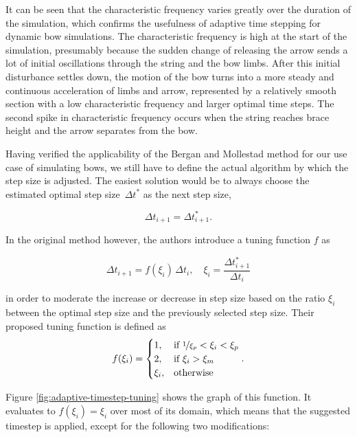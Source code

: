 It can be seen that the characteristic frequency varies greatly over the duration of the simulation, which confirms the usefulness of adaptive time stepping for dynamic bow simulations.
The characteristic frequency is high at the start of the simulation, presumably because the sudden change of releasing the arrow sends a lot of initial oscillations through the string and the bow limbs.
After this initial disturbance settles down, the motion of the bow turns into a more steady and continuous acceleration of limbs and arrow, represented by a relatively smooth section with a low characteristic frequency and larger optimal time steps.
The second spike in characteristic frequency occurs when the string reaches brace height and the arrow separates from the bow.

Having verified the applicability of the Bergan and Mollestad method for our use case of simulating bows, we still have to define the actual algorithm by which the step size is adjusted.
The easiest solution would be to always choose the estimated optimal step size~$\Delta t^*$ as the next step size,

\begin{equation}
\Delta t_{i+1} = \Delta t^*_{i+1}.
\end{equation}

In the original method however, the authors introduce a tuning function $f$ as

\begin{equation}
\Delta t_{i+1} = f(\xi_{i})\,\Delta t_{i}, \quad \xi_{i} = \frac{\Delta t^*_{i+1}}{\Delta t_{i}}
\end{equation}

in order to moderate the increase or decrease in step size based on the ratio $\xi_{i}$ between the optimal step size and the previously selected step size.
Their proposed tuning function is defined as
%
\begin{align}
f(\xi_{i}) = \begin{cases}
1, & \text{if $\nicefrac{1}{\xi_{p}} < \xi_{i} < \xi_{p}$} \\
2, & \text{if $\xi_{i} > \xi_{m}$} \\
\xi_{i}, & \text{otherwise}
\end{cases}.
\end{align}

Figure \ref{fig:adaptive-timestep-tuning} shows the graph of this function.
It evaluates to $f(\xi_{i}) = \xi_{i}$ over most of its domain, which means that the suggested timestep is applied, except for the following two modifications:

